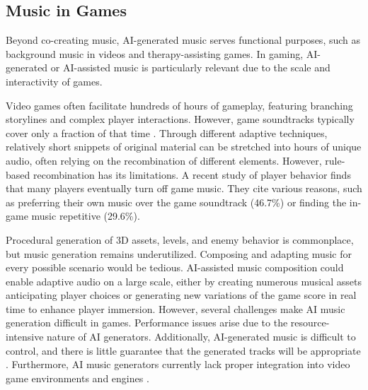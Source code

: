 \subsection{Music in Games}
Beyond co-creating music, AI-generated music serves functional purposes, such as background music in videos and therapy-assisting games. In gaming, AI-generated or AI-assisted music is particularly relevant due to the scale and interactivity of games.

Video games often facilitate hundreds of hours of gameplay, featuring branching storylines and complex player interactions. However, game soundtracks typically cover only a fraction of that time \cite{Plut_Pasquier_2020, Worrall_Collins_2024}. Through different adaptive techniques, relatively short snippets of original material can be stretched into hours of unique audio, often relying on the recombination of different elements. However, rule-based recombination has its limitations. A recent study of player behavior \cite{Rogers_Weber_2019} finds that many players eventually turn off game music. They cite various reasons, such as preferring their own music over the game soundtrack (46.7\%) or finding the in-game music repetitive (29.6\%).

Procedural generation of 3D assets, levels, and enemy behavior is commonplace, but music generation remains underutilized. Composing and adapting music for every possible scenario would be tedious. AI-assisted music composition could enable adaptive audio on a large scale, either by creating numerous musical assets anticipating player choices or generating new variations of the game score in real time to enhance player immersion. However, several challenges make AI music generation difficult in games. Performance issues arise due to the resource-intensive nature of AI generators. Additionally, AI-generated music is difficult to control, and there is little guarantee that the generated tracks will be appropriate \cite{Plut_Pasquier_2020}. Furthermore, AI music generators currently lack proper integration into video game environments and engines \cite{Worrall_Collins_2024}.

